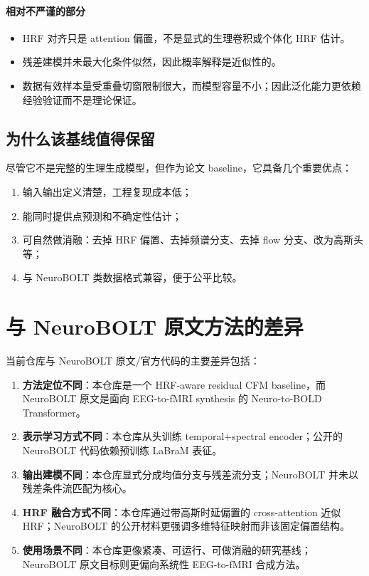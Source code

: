 \documentclass[11pt,a4paper]{ctexart}
\begin{document}
\paragraph{相对不严谨的部分}
\begin{itemize}
  \item HRF 对齐只是 attention 偏置，不是显式的生理卷积或个体化 HRF 估计。
  \item 残差建模并未最大化条件似然，因此概率解释是近似性的。
  \item 数据有效样本量受重叠切窗限制很大，而模型容量不小；因此泛化能力更依赖经验验证而不是理论保证。
\end{itemize}

\subsection{为什么该基线值得保留}

尽管它不是完整的生理生成模型，但作为论文 baseline，它具备几个重要优点：
\begin{enumerate}
  \item 输入输出定义清楚，工程复现成本低；
  \item 能同时提供点预测和不确定性估计；
  \item 可自然做消融：去掉 HRF 偏置、去掉频谱分支、去掉 flow 分支、改为高斯头等；
  \item 与 NeuroBOLT 类数据格式兼容，便于公平比较。
\end{enumerate}

\section{与 NeuroBOLT 原文方法的差异}

当前仓库与 NeuroBOLT 原文/官方代码的主要差异包括：
\begin{enumerate}
  \item \textbf{方法定位不同}：本仓库是一个 HRF-aware residual CFM baseline，而 NeuroBOLT 原文是面向 EEG-to-fMRI synthesis 的 Neuro-to-BOLD Transformer。
  \item \textbf{表示学习方式不同}：本仓库从头训练 temporal+spectral encoder；公开的 NeuroBOLT 代码依赖预训练 LaBraM 表征。
  \item \textbf{输出建模不同}：本仓库显式分成均值分支与残差流分支；NeuroBOLT 并未以残差条件流匹配为核心。
  \item \textbf{HRF 融合方式不同}：本仓库通过带高斯时延偏置的 cross-attention 近似 HRF；NeuroBOLT 的公开材料更强调多维特征映射而非该固定偏置结构。
  \item \textbf{使用场景不同}：本仓库更像紧凑、可运行、可做消融的研究基线；NeuroBOLT 原文目标则更偏向系统性 EEG-to-fMRI 合成方法。
\end{enumerate}
\end{document}
